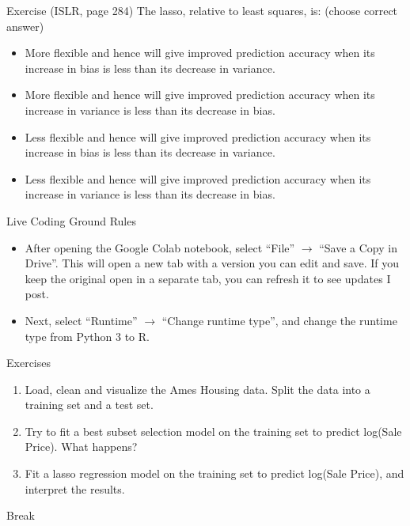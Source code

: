 \documentclass{beamer}
\begin{document}
  \begin{frame}{Exercise (ISLR, page 284)}
    The lasso, relative to least squares, is: (choose correct answer)
    \begin{itemize}
      \item[i.] More flexible and hence will give improved prediction accuracy when its increase in bias is less than its decrease in variance.
      \item[ii.] More flexible and hence will give improved prediction accuracy when its increase in variance is less than its decrease in bias.
      \item[iii.] Less flexible and hence will give improved prediction accuracy when its increase in bias is less than its decrease in variance.
      \item[iv.] Less flexible and hence will give improved prediction accuracy when its increase in variance is less than its decrease in bias.
    \end{itemize}
  \end{frame}

  \begin{frame}{Live Coding}
    Ground Rules
    \begin{itemize}
      \item After opening the Google Colab notebook, select ``File'' $\rightarrow$ ``Save a Copy in Drive''. This will open a new tab with a version you can edit and save. If you keep the original open in a separate tab, you can refresh it to see updates I post.
      \item Next, select ``Runtime'' $\rightarrow$ ``Change runtime type'', and change the runtime type from Python 3 to R.
    \end{itemize}
    \vfill
    Exercises
    \begin{enumerate}
      \item Load, clean and visualize the Ames Housing data. Split the data into a training set and a test set.
      \item Try to fit a best subset selection model on the training set to predict log(Sale Price). What happens?
      \item Fit a lasso regression model on the training set to predict log(Sale Price), and interpret the results.
    \end{enumerate}
  \end{frame}

  \begin{frame}
    Break \smiley{}
  \end{frame}
\end{document}
